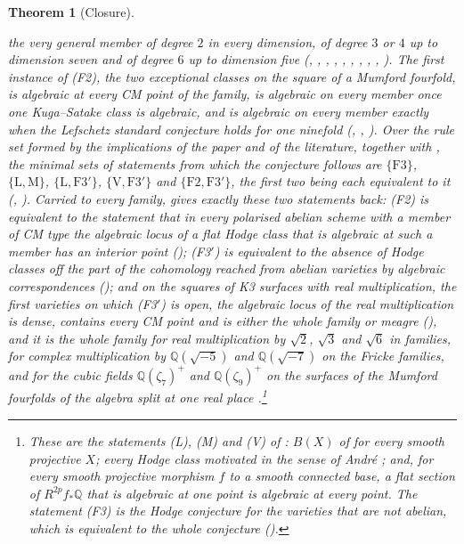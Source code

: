\documentclass[11pt,reqno]{amsart}
\theoremstyle{plain}
\newtheorem{theorem}{Theorem}[section]
\theoremstyle{definition}
\theoremstyle{remark}
\newcommand{\QQ}{\mathbb{Q}}
\begin{document}
\begin{theorem}[Closure]
\begin{enumerate}[label=\textup{(\roman*)},leftmargin=2.8em,itemsep=4pt]
  the very general member of degree $2$ in every dimension, of degree $3$ or
  $4$ up to dimension seven and of degree $6$ up to dimension five
  (, ,
  , ,
  , , ,
  , ,
  ). The first instance of
  \textup{(F2)}, the two exceptional classes on the square of a Mumford
  fourfold, is algebraic at every CM point of the family, is algebraic on
  every member once one Kuga--Satake class is algebraic, and is algebraic on
  every member exactly when the Lefschetz standard conjecture holds for one
  ninefold (, ,
  ). Over the rule set formed by the implications of
  the paper and of the literature, together with , the
  minimal sets of statements from which the conjecture follows are
  $\{\mathrm{F3}\}$, $\{\mathrm{L},\mathrm{M}\}$,
  $\{\mathrm{L},\mathrm{F3}'\}$, $\{\mathrm{V},\mathrm{F3}'\}$ and
  $\{\mathrm{F2},\mathrm{F3}'\}$, the first two being each equivalent to it
  (, ). Carried to every family,
  \cite[Theorem~1.1]{paperI} gives exactly these two statements back:
  \textup{(F2)} is equivalent to the statement that in every polarised
  abelian scheme with a member of CM type the algebraic locus of a flat
  Hodge class that is algebraic at such a member has an interior point
  (); \textup{(F3$'$)} is equivalent to the absence
  of Hodge classes off the part of the cohomology reached from abelian
  varieties by algebraic correspondences (); and on the
  squares of K3 surfaces with real multiplication, the first varieties on
  which \textup{(F3$'$)} is open, the algebraic locus of the real
  multiplication is dense, contains every CM point and is either the whole
  family or meagre (), and it is the whole family for
  real multiplication by $\sqrt2$, $\sqrt3$ and $\sqrt6$ in families, for
  complex multiplication by $\QQ(\sqrt{-5})$ and $\QQ(\sqrt{-7})$ on the
  Fricke families, and for the cubic fields $\QQ(\zeta_{7})^{+}$ and
  $\QQ(\zeta_{9})^{+}$ on the surfaces of the Mumford fourfolds of the
  algebra split at one real place \cite{BB26dense}.\footnote{These are the statements
  \textup{(L)}, \textup{(M)} and \textup{(V)} of : $B(X)$ of
  \cite[Definition~10.6]{paperI} for every smooth projective $X$; every Hodge class
  motivated in the sense of Andr\'e \cite[\S2.1]{And96b}; and, for every
  smooth projective morphism $f$ to a smooth connected base, a flat section of
  $R^{2p}f_{*}\QQ$ that is algebraic at one point is algebraic at every
  point. The statement (F3) is the Hodge conjecture for the varieties that
  are not abelian, which is equivalent to the whole conjecture
  ().}
\end{enumerate}
\end{theorem}
\end{document}
